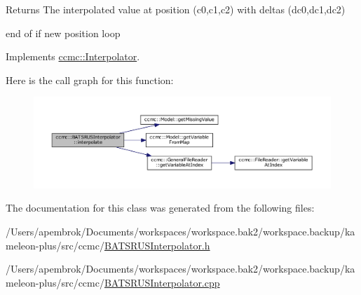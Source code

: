 \begin{DoxyReturn}{Returns}
The interpolated value at position (c0,c1,c2) with deltas (dc0,dc1,dc2) 
\end{DoxyReturn}
end of if new position loop 

Implements \hyperlink{classccmc_1_1_interpolator_aa6b272bd53630020d92938ec1e5cfad9}{ccmc\-::\-Interpolator}.



Here is the call graph for this function\-:\nopagebreak
\begin{figure}[H]
\begin{center}
\leavevmode
\includegraphics[width=350pt]{classccmc_1_1_b_a_t_s_r_u_s_interpolator_a8bb4e9b10064a516192c771462673b09_cgraph}
\end{center}
\end{figure}




The documentation for this class was generated from the following files\-:\begin{DoxyCompactItemize}
\item 
/\-Users/apembrok/\-Documents/workspaces/workspace.\-bak2/workspace.\-backup/kameleon-\/plus/src/ccmc/\hyperlink{_b_a_t_s_r_u_s_interpolator_8h}{B\-A\-T\-S\-R\-U\-S\-Interpolator.\-h}\item 
/\-Users/apembrok/\-Documents/workspaces/workspace.\-bak2/workspace.\-backup/kameleon-\/plus/src/ccmc/\hyperlink{_b_a_t_s_r_u_s_interpolator_8cpp}{B\-A\-T\-S\-R\-U\-S\-Interpolator.\-cpp}\end{DoxyCompactItemize}
